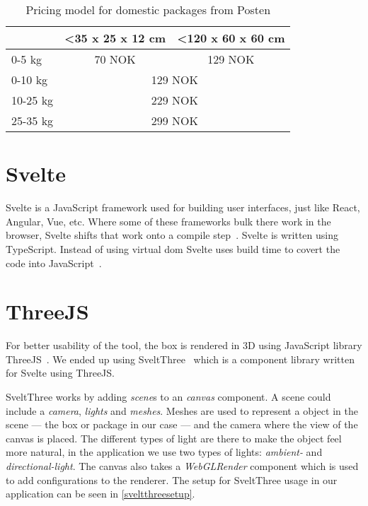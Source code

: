 \begin{table}[h]
    \centering
    \caption{Pricing model for domestic packages from Posten}
    \label{pricingmodel}
    \begin{tabular}{|l|cl|}
    \hline
             & \multicolumn{1}{l|}{\textless 35 x 25 x 12 cm} & \textless 120 x 60 x 60 cm    \\ \hline
    0-5 kg   & \multicolumn{1}{c|}{70 NOK}                     & \multicolumn{1}{c|}{129 NOK} \\ \hline
    0-10 kg  & \multicolumn{2}{c|}{129 NOK}                                                   \\ \hline
    10-25 kg & \multicolumn{2}{c|}{229 NOK}                                                   \\ \hline
    25-35 kg & \multicolumn{2}{c|}{299 NOK}                                                   \\ \hline
    \end{tabular}
\end{table}


\section{Svelte}
Svelte is a JavaScript framework used for building user interfaces, just like React, Angular, Vue, etc. Where some of these frameworks bulk there work in the browser, Svelte shifts that work onto a compile step~\cite{sveltewebsite}. Svelte is written using TypeScript. Instead of using virtual \gls{dom} Svelte uses build time to covert the code into JavaScript~\cite{sveltedocs}. 

\section{ThreeJS}
For better usability of the tool, the box is rendered in 3D using JavaScript library ThreeJS~\cite{threejs}. We ended up using SveltThree~\cite{sveltthree} which is a component library written for Svelte using ThreeJS. 

SveltThree works by adding \textit{scene}s to an \textit{canvas} component. A scene could include a \textit{camera}, \textit{lights} and \textit{meshes}. Meshes are used to represent a object in the scene --- the box or package in our case --- and the camera where the view of the canvas is placed. The different types of light are there to make the object feel more natural, in the application we use two types of lights: \textit{ambient-} and \textit{directional-light}. The canvas also takes a \textit{WebGLRender} component which is used to add configurations to the renderer. The setup for SveltThree usage in our application can be seen in \autoref{sveltthreesetup}.

